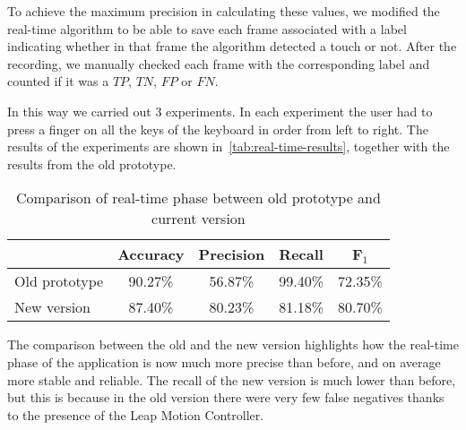 To achieve the maximum precision in calculating these values, we modified the real-time algorithm to be able to save
each frame associated with a label indicating whether in that frame the algorithm detected a touch or not.
After the recording, we manually checked each frame with the corresponding label and counted if it was a $TP$, $TN$, $FP$ or $FN$.

In this way we carried out 3 experiments.
In each experiment the user had to press a finger on all the keys of the keyboard in order from left to right.
The results of the experiments are shown in~\autoref{tab:real-time-results},
together with the results from the old prototype.

\begin{table}[ht]
	\centering
	\begin{tabular}{c|c|c|c|c|}
		\cline{2-5}
		& Accuracy                      & Precision                     & Recall                        & F$_1$                         \\ \hline
		\multicolumn{1}{|l|}{Old prototype} & \multicolumn{1}{|c|}{90.27\%} & \multicolumn{1}{|c|}{56.87\%} & \multicolumn{1}{|c|}{99.40\%} & \multicolumn{1}{|c|}{72.35\%} \\ \hline
		\multicolumn{1}{|l|}{New version}   & \multicolumn{1}{|c|}{87.40\%} & \multicolumn{1}{|c|}{80.23\%} & \multicolumn{1}{|c|}{81.18\%} & \multicolumn{1}{|c|}{80.70\%} \\ \hline
	\end{tabular}
	\caption{Comparison of real-time phase between old prototype and current version}
	\label{tab:real-time-results}
\end{table}

The comparison between the old and the new version highlights how the real-time phase of the application is now much
more precise than before, and on average more stable and reliable.
The recall of the new version is much lower than before, but this is because in the old version there were very few
false negatives thanks to the presence of the Leap Motion Controller.
